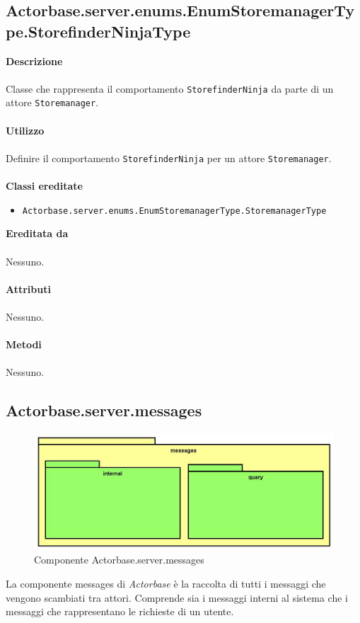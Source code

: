 \documentclass[a4paper]{article}
\begin{document}
			\subsection{Actorbase.server.enums.EnumStoremanagerType.StorefinderNinjaType}
		\textbf{Descrizione}
			\\ \\
			Classe che rappresenta il comportamento \texttt{StorefinderNinja} da parte di un attore \texttt{Storemanager}.
			\\ \\
		\textbf{Utilizzo}
			\\ \\
			Definire il comportamento \texttt{StorefinderNinja} per un attore \texttt{Storemanager}.
			\\ \\
		\textbf{Classi ereditate}
			\begin{itemize}
				\item \texttt{Actorbase.server.enums.EnumStoremanagerType.StoremanagerType}
			\end{itemize}
		\textbf{Ereditata da}
		\\ \\
		Nessuno.
		\\ \\
		\textbf{Attributi}
		\\ \\
			Nessuno.
		\\ \\
		\textbf{Metodi}
			\\ \\
			Nessuno.	
			
	\subsection{Actorbase.server.messages}
		\begin{figure}[H]
			\centering
			\includegraphics[scale=0.5]{Server/messagesLevel.jpg}
			\caption{Componente Actorbase.server.messages}
		\end{figure}
		La componente messages di \emph{Actorbase} è la raccolta di tutti i messaggi che vengono scambiati tra attori. Comprende sia i messaggi interni al sistema che i messaggi che rappresentano le richieste di un utente.
		
\end{document}
